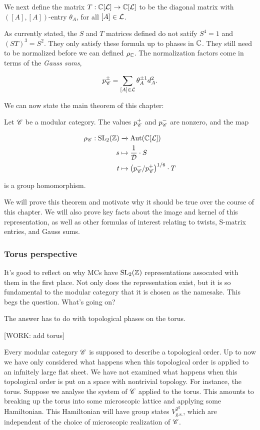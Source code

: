 We next define the matrix $T:\mathbb{C}[\mathcal{L}]\to\mathbb{C}[\mathcal{L}]$ to be the diagonal matrix with $([A],[A])$-entry $\theta_{A}$, for all $[A]\in \mathcal{L}$.

As currently stated, the $S$ and $T$ matrices defined do not satify $S^4=1$ and $(ST)^3=S^2$. They only satisfy these formula up to phases in $\mathbb{C}$. They still need to be normalized before we can defined $\rho_{\mathbb{C}}$. The normalization factors come in terms of the \textit{Gauss sums},

$$p^{\pm}_{\mathscr{C}}=\sum_{[A]\in \mathcal{L}}\theta_A^{\pm 1}d_A^2.$$

We can now state the main theorem of this chapter:

\begin{theorem} Let $\mathscr{C}$ be a modular category. The values $p_{\mathscr{C}}^{+}$ and $p_{\mathscr{C}}^{-}$ are nonzero, and the map

\begin{align*}
\rho_{\mathscr{C}}:\operatorname{SL}_2(\mathbb{Z})&\xrightarrow{}\operatorname{Aut}(\mathbb{C}[\mathcal{L}])\\
s & \mapsto \frac{1}{\mathcal{D}}\cdot S\\ 
t & \mapsto \left(p_{\mathscr{C}}^{-}/p_{\mathscr{C}}^+\right)^{1/6}\cdot T
\end{align*}

is a group homomorphism.
\end{theorem}

We will prove this theorem and motivate why it should be true over the course of this chapter. We will also prove key facts about the image and kernel of this representation, as well as other formulas of interest relating to twists, S-matrix entries, and Gauss sums.

\subsubsection{Torus perspective}

It's good to reflect on why MCs have $\operatorname{SL}_2(\mathbb{Z})$ representations assocated with them in the first place. Not only does the representation exist, but it is so fundamental to the modular category that it is chosen as the namesake. This begs the question. What's going on?

The answer has to do with topological phases on the torus.

[WORK: add torus]

Every modular category $\mathscr{C}$ is supposed to describe a topological order. Up to now we have only considered what happens when this topological order is applied to an infnitely large flat sheet. We have not examined what happens when this topological order is put on a space with nontrivial topology. For instance, the torus. Suppose we analyse the system of $\mathscr{C}$ applied to the torus. This amounts to breaking up the torus into some microscopic lattice and applying some Hamiltonian. This Hamiltonian will have group states $V_{\text{g.s.}}^{T^2}$, which are independent of the choice of microscopic realization of $\mathscr{C}$.

